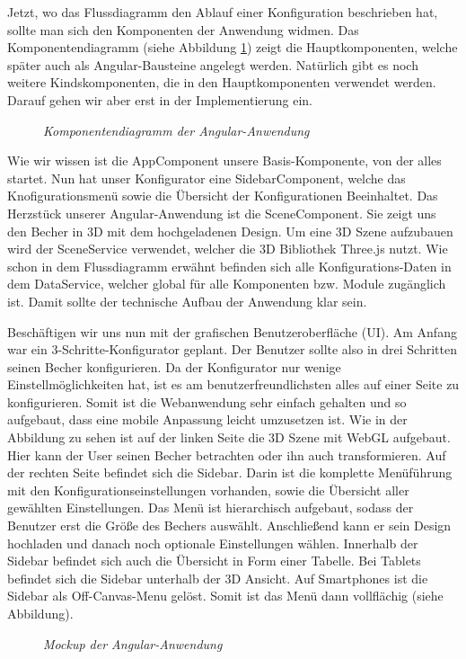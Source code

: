  Jetzt, wo das Flussdiagramm den Ablauf einer Konfiguration beschrieben hat, sollte man sich den Komponenten der Anwendung widmen. Das Komponentendiagramm (siehe Abbildung \ref{fig:ngKomponent}) zeigt die Hauptkomponenten, welche später auch als Angular-Bausteine angelegt werden. Natürlich gibt es noch weitere Kindskomponenten, die in den Hauptkomponenten verwendet werden. Darauf gehen wir aber erst in der Implementierung ein.
\begin{figure}[h]
	\centering
	{}
	\caption[Komponentendiagramm]{\textit{Komponentendiagramm der Angular-Anwendung}}
	\label{fig:ngKomponent}
\end{figure} 
Wie wir wissen ist die AppComponent unsere Basis-Komponente, von der alles startet. Nun hat unser Konfigurator eine SidebarComponent, welche das Knofigurationsmenü sowie die Übersicht der Konfigurationen Beeinhaltet. Das Herzstück unserer Angular-Anwendung ist die SceneComponent. Sie zeigt uns den Becher in 3D mit dem hochgeladenen Design. Um eine 3D Szene aufzubauen wird der SceneService verwendet, welcher die 3D Bibliothek Three.js nutzt. Wie schon in dem Flussdiagramm erwähnt befinden sich alle Konfigurations-Daten in dem DataService, welcher global für alle Komponenten bzw. Module zugänglich ist. Damit sollte der technische Aufbau der Anwendung klar sein.

Beschäftigen wir uns nun mit der grafischen Benutzeroberfläche (UI). Am Anfang war ein 3-Schritte-Konfigurator geplant. Der Benutzer sollte also in drei Schritten seinen Becher konfigurieren. Da der Konfigurator nur wenige Einstellmöglichkeiten hat, ist es am benutzerfreundlichsten alles auf einer Seite zu konfigurieren. Somit ist die Webanwendung sehr einfach gehalten und so aufgebaut, dass eine mobile Anpassung leicht umzusetzen ist. Wie in der Abbildung zu sehen ist auf der linken Seite die 3D Szene mit WebGL aufgebaut. Hier kann der User seinen Becher betrachten oder ihn auch transformieren. Auf der rechten Seite befindet sich die Sidebar. Darin ist die komplette Menüführung mit den Konfigurationseinstellungen vorhanden, sowie die Übersicht aller gewählten Einstellungen. Das Menü ist hierarchisch aufgebaut, sodass der Benutzer erst die Größe des Bechers auswählt. Anschließend kann er sein Design hochladen und danach noch optionale Einstellungen wählen. Innerhalb der Sidebar befindet sich auch die Übersicht in Form einer Tabelle. Bei Tablets befindet sich die Sidebar unterhalb der 3D Ansicht. Auf Smartphones ist die Sidebar als Off-Canvas-Menu gelöst. Somit ist das Menü dann vollflächig (siehe Abbildung).
\begin{figure}[h]
	\centering
	{}
	\caption[Mockup]{\textit{Mockup der Angular-Anwendung}}
	\label{fig:mockup}
\end{figure}

